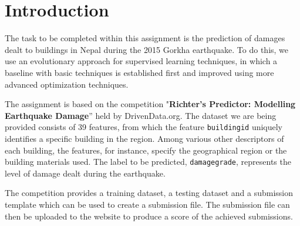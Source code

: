\section{Introduction}
\label{CHAPTER_Introduction}
The task to be completed within this assignment is the prediction of damages dealt to buildings in Nepal during the 2015 Gorkha earthquake. To do this, we use an evolutionary approach for supervised learning techniques, in which a baseline with basic techniques is established first and improved using more advanced optimization techniques. 

The assignment is based on the competition "\textbf{Richter's Predictor: Modelling Earthquake Damage}” held by DrivenData.org. The dataset we are being provided consists of 39 features, from which the feature \texttt{buildingid} uniquely identifies a specific building in the region. Among various other descriptors of each building, the features, for instance, specify the geographical region or the building materials used. The label to be predicted, \texttt{damagegrade}, represents the level of damage dealt during the earthquake.

The competition provides a training dataset, a testing dataset and a submission template which can be used to create a submission file. The submission file can then be uploaded to the website to produce a score of the achieved submissions.